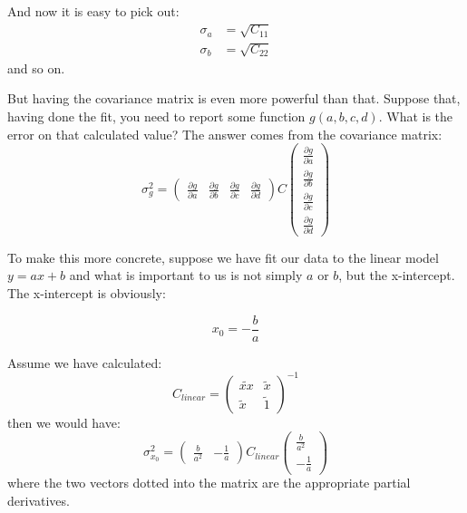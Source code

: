 \documentclass[letterpaper,12pt]{article}
\newcommand{\myMatrix}[1]{\bm{\mathit{#1}}}
\begin{document}
And now it is easy to pick out:
\begin{equation}
\begin{aligned}
\sigma_a&=\sqrt{\myMatrix{C}_{11}} \\
\sigma_b&=\sqrt{\myMatrix{C}_{22}} 
\end{aligned}
\end{equation}
and so on.

But having the covariance matrix is even more powerful than that. Suppose that, having done the fit, you need to report some function $g(a,b,c,d)$. What is the error on that calculated value? The answer comes from the covariance matrix:
\begingroup
\renewcommand*{\arraystretch}{1.5}
\begin{equation}
\sigma_g^2=
\begin{pmatrix}
\frac{\partial g}{\partial a} &\frac{\partial g}{\partial b} &\frac{\partial g}{\partial c} &\frac{\partial g}{\partial d} 
\end{pmatrix}
\myMatrix{C}
\begin{pmatrix}
\frac{\partial g}{\partial a} \\
\frac{\partial g}{\partial b} \\
\frac{\partial g}{\partial c} \\
\frac{\partial g}{\partial d} 
\end{pmatrix}
\end{equation}
\endgroup

To make this more concrete, suppose we have fit our data to the linear model $y=ax+b$ and what is important to us is not simply $a$ or $b$, but the x-intercept. The x-intercept is obviously:

\begin{equation}
x_0=-\frac{b}{a}
\end{equation}

Assume we have calculated:
\begin{equation}
\myMatrix{C}_{linear}=
\begin{pmatrix}
\widetilde{xx} & \widetilde{x} \\
\widetilde{x} & \widetilde{1}
\end{pmatrix} ^{-1}
\end{equation}
then we would have:
\begingroup
\renewcommand*{\arraystretch}{1.5}
\begin{equation}
\sigma_{x_0}^2=\begin{pmatrix}
\frac{b}{a^2} & -\frac{1}{a}
\end{pmatrix}
\myMatrix{C}_{linear}
\begin{pmatrix}
\frac{b}{a^2} \\
-\frac{1}{a}
\end{pmatrix}
\end{equation}
\endgroup
where the two vectors dotted into the matrix are the appropriate partial derivatives.
\end{document}
